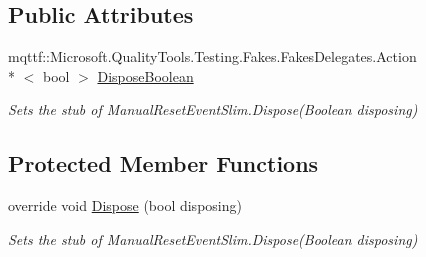\subsection*{Public Attributes}
\begin{DoxyCompactItemize}
\item 
mqttf\-::\-Microsoft.\-Quality\-Tools.\-Testing.\-Fakes.\-Fakes\-Delegates.\-Action\\*
$<$ bool $>$ \hyperlink{class_system_1_1_threading_1_1_fakes_1_1_stub_manual_reset_event_slim_a32cfca2e7b5e31679fec28d1860c3426}{Dispose\-Boolean}
\begin{DoxyCompactList}\small\item\em Sets the stub of Manual\-Reset\-Event\-Slim.\-Dispose(\-Boolean disposing)\end{DoxyCompactList}\end{DoxyCompactItemize}
\subsection*{Protected Member Functions}
\begin{DoxyCompactItemize}
\item 
override void \hyperlink{class_system_1_1_threading_1_1_fakes_1_1_stub_manual_reset_event_slim_a283d928877a9175137af297157f825d8}{Dispose} (bool disposing)
\begin{DoxyCompactList}\small\item\em Sets the stub of Manual\-Reset\-Event\-Slim.\-Dispose(\-Boolean disposing)\end{DoxyCompactList}\end{DoxyCompactItemize}
